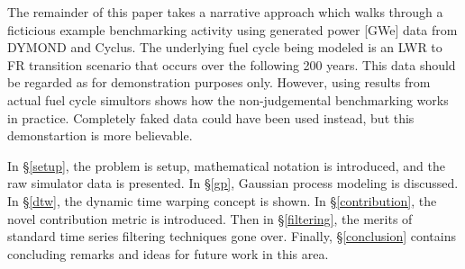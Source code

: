 The remainder of this paper takes a narrative approach which walks through 
a ficticious example benchmarking activity using generated power [GWe] data 
from DYMOND and Cyclus. The underlying fuel cycle being modeled is an
LWR to FR transition scenario that occurs over the following 200 years.  
This data should be regarded as for demonstration purposes only. However, 
using results from actual fuel cycle simultors shows how the non-judgemental
benchmarking works in practice. Completely faked data could have been used 
instead, but this demonstartion is more believable.

In \S \ref{setup}, the problem is setup, mathematical notation is introduced, 
and the raw simulator data is presented. In \S \ref{gp}, Gaussian process 
modeling is discussed. In \S \ref{dtw}, the dynamic time warping concept is
shown. In \S \ref{contribution}, the novel contribution metric is introduced.
Then in \S \ref{filtering}, the merits of standard time series filtering
techniques gone over. Finally, \S \ref{conclusion} contains concluding remarks
and ideas for future work in this area.
